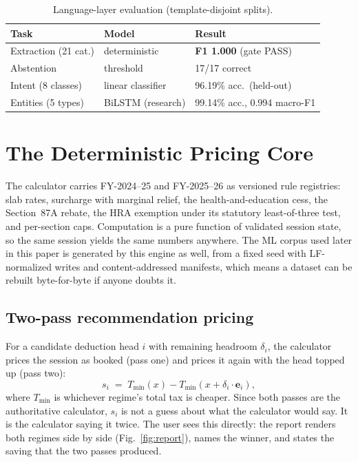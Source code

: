 \documentclass[conference]{IEEEtran}
\newcommand{\thead}[1]{\textbf{#1}}
\begin{document}
\begin{table}[t]
\caption{Language-layer evaluation (template-disjoint splits).}
\label{tab:nlp}
\centering
\footnotesize
\begin{tabular}{@{}lll@{}}
\toprule
\rowcolor{black!6}
\thead{Task} & \thead{Model} & \thead{Result} \\
\midrule
Extraction (21 cat.) & deterministic & \textbf{F1 1.000} (gate PASS) \\
Abstention & threshold & 17/17 correct \\
Intent (8 classes) & linear classifier & 96.19\% acc.\ (held-out) \\
Entities (5 types) & BiLSTM (research) & 99.14\% acc., 0.994 macro-F1 \\
\bottomrule
\end{tabular}
\end{table}

\section{The Deterministic Pricing Core}
The calculator carries FY-2024--25 and FY-2025--26 as versioned rule
registries: slab rates, surcharge with marginal relief, the
health-and-education cess, the Section~87A rebate, the HRA exemption
under its statutory least-of-three test, and per-section caps.
Computation is a pure function of validated session state, so the same
session yields the same numbers anywhere. The ML corpus used later in
this paper is generated by this engine as well, from a fixed seed with
LF-normalized writes and content-addressed manifests, which means a
dataset can be rebuilt byte-for-byte if anyone doubts it.

\subsection{Two-pass recommendation pricing}
For a candidate deduction head $i$ with remaining headroom $\delta_i$,
the calculator prices the session as booked (pass one) and prices it
again with the head topped up (pass two):
\begin{equation}
s_i \;=\; T_{\min}(x) - T_{\min}(x + \delta_i \cdot \mathbf{e}_i),
\end{equation}
where $T_{\min}$ is whichever regime's total tax is cheaper. Since
both passes are the authoritative calculator, $s_i$ is not a guess
about what the calculator would say. It is the calculator saying it
twice. The user sees this directly: the report renders both regimes
side by side (Fig.~\ref{fig:report}), names the winner, and states the
saving that the two passes produced.
\end{document}
